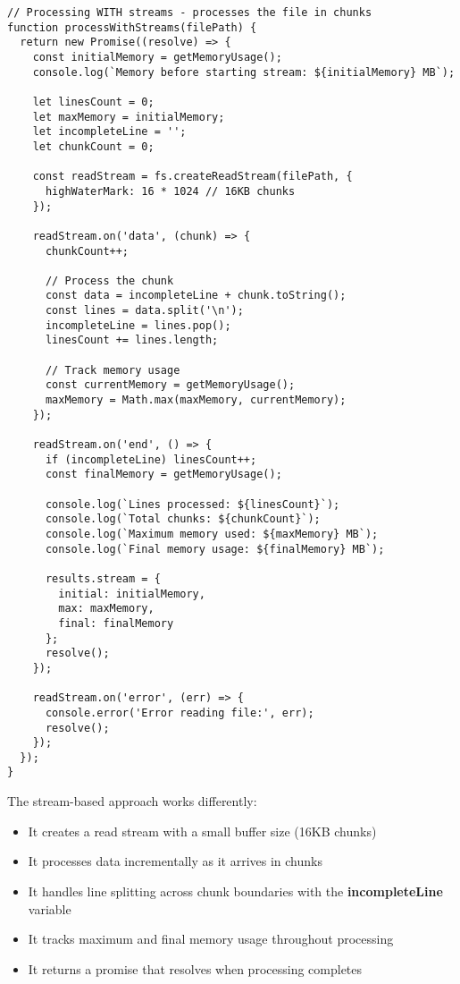 \documentclass[12pt,letterpaper]{article}
\newenvironment{macterminal}{%
    \begin{mdframed}[
        linecolor=terminalFrame,
        backgroundcolor=terminalBg,
        roundcorner=5pt,
        skipabove=5pt,
        skipbelow=5pt,
        linewidth=1pt,
        innertopmargin=5pt,
        frametitle={%
            \tikz[baseline=(current bounding box.east), outer sep=0pt]{
                \fill[red!80!black] (0,0) circle (5pt);
                \fill[yellow!80!black] (0.7,0) circle (5pt);
                \fill[green!70!black] (1.4,0) circle (5pt);
            }
        },
        frametitlealignment=\raggedright,
        frametitleaboveskip=8pt,
        frametitlebelowskip=0pt,
    ]
}{%
    \end{mdframed}%
}
\begin{document}
\begin{macterminal}
\begin{lstlisting}
// Processing WITH streams - processes the file in chunks
function processWithStreams(filePath) {
  return new Promise((resolve) => {
    const initialMemory = getMemoryUsage();
    console.log(`Memory before starting stream: ${initialMemory} MB`);
    
    let linesCount = 0;
    let maxMemory = initialMemory;
    let incompleteLine = '';
    let chunkCount = 0;
    
    const readStream = fs.createReadStream(filePath, {
      highWaterMark: 16 * 1024 // 16KB chunks
    });
    
    readStream.on('data', (chunk) => {
      chunkCount++;
      
      // Process the chunk
      const data = incompleteLine + chunk.toString();
      const lines = data.split('\n');
      incompleteLine = lines.pop();
      linesCount += lines.length;
      
      // Track memory usage
      const currentMemory = getMemoryUsage();
      maxMemory = Math.max(maxMemory, currentMemory);
    });
    
    readStream.on('end', () => {
      if (incompleteLine) linesCount++;
      const finalMemory = getMemoryUsage();
      
      console.log(`Lines processed: ${linesCount}`);
      console.log(`Total chunks: ${chunkCount}`);
      console.log(`Maximum memory used: ${maxMemory} MB`);
      console.log(`Final memory usage: ${finalMemory} MB`);
      
      results.stream = { 
        initial: initialMemory,
        max: maxMemory, 
        final: finalMemory 
      };
      resolve();
    });

    readStream.on('error', (err) => {
      console.error('Error reading file:', err);
      resolve();
    });
  });
}
\end{lstlisting}
\end{macterminal}

The stream-based approach works differently:
\begin{itemize}
    \item It creates a read stream with a small buffer size (16KB chunks)
    \item It processes data incrementally as it arrives in chunks
    \item It handles line splitting across chunk boundaries with the \textbf{\textcolor{accentColor}{incompleteLine}} variable
    \item It tracks maximum and final memory usage throughout processing
    \item It returns a promise that resolves when processing completes
\end{itemize}
\end{document}
